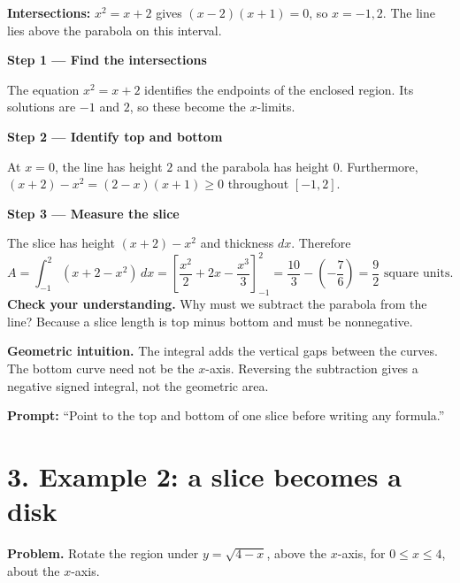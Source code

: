 \documentclass[11pt,letterpaper]{article}
\newcommand{\topic}[1]{\section*{#1}}
\newcommand{\intuition}[1]{\par\textbf{Geometric intuition.} #1\par}
\newcommand{\step}[2]{\par\textbf{Step #1 --- #2}\par}
\begin{document}
\textbf{Intersections:} $x^2=x+2$ gives $(x-2)(x+1)=0$, so $x=-1,2$. The line lies above the parabola on this interval.
\begin{center}\end{center}
\step{1}{Find the intersections}
The equation $x^2=x+2$ identifies the endpoints of the enclosed region. Its solutions are $-1$ and $2$, so these become the $x$-limits.
\step{2}{Identify top and bottom}
At $x=0$, the line has height $2$ and the parabola has height $0$. Furthermore, $(x+2)-x^2=(2-x)(x+1)\geq0$ throughout $[-1,2]$.
\step{3}{Measure the slice}
The slice has height $(x+2)-x^2$ and thickness $dx$. Therefore
\[
A=\int_{-1}^2(x+2-x^2)\,dx
=\left[\frac{x^2}{2}+2x-\frac{x^3}{3}\right]_{-1}^2
=\frac{10}{3}-\left(-\frac76\right)
=\boxed{\frac92\text{ square units}}.
\]
\textbf{Check your understanding.} Why must we subtract the parabola from the line? Because a slice length is top minus bottom and must be nonnegative.
\intuition{The integral adds the vertical gaps between the curves. The bottom curve need not be the $x$-axis. Reversing the subtraction gives a negative signed integral, not the geometric area.}
\textbf{Prompt:} ``Point to the top and bottom of one slice before writing any formula.''
\newpage
\topic{3. Example 2: a slice becomes a disk}
\textbf{Problem.} Rotate the region under $y=\sqrt{4-x}$, above the $x$-axis, for $0\leq x\leq4$, about the $x$-axis.
\begin{center}\end{center}
\end{document}
